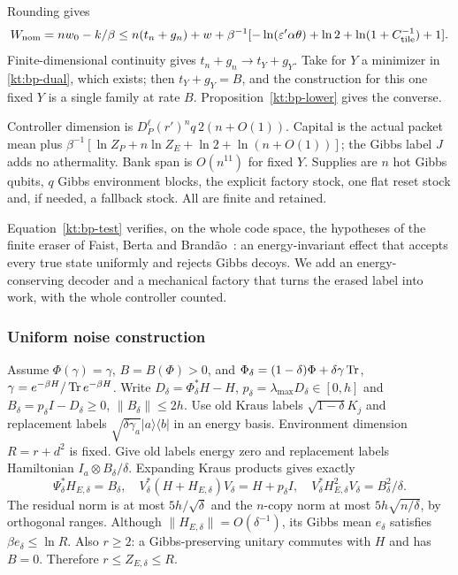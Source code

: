 Rounding gives
\[
 W_{\rm nom}=nw_0-k/\beta
 \le n(t_n+g_n)+w+\beta^{-1}
 [-\ln(\varepsilon'\alpha\theta)+\ln2+
              \ln(1+C_{\rm tile}^{-1})+1].
\]
Finite-dimensional continuity gives $t_n+g_n\to t_Y+g_Y$.
Take for $Y$ a minimizer in \eqref{kt:bp-dual}, which exists; then
$t_Y+g_Y=B$, and the construction for this one fixed $Y$ is a single
family at rate $B$.
Proposition~\ref{kt:bp-lower} gives the converse.

Controller dimension is $D_P^\ell(r')^nq\,2(n+O(1))$.
Capital is the actual packet mean plus
$\beta^{-1}[\ln Z_P+n\ln Z_E+\ln2+\ln(n+O(1))]$;
the Gibbs label $J$ adds no athermality. Bank span is $O(n^{11})$
for fixed $Y$. Supplies are $n$ hot Gibbs qubits, $q$ Gibbs
environment blocks, the explicit factory stock, one flat reset stock
and, if needed, a fallback stock. All are finite and retained.

\begin{remark}\label{kt:bp-rem:eraser}
Equation~\eqref{kt:bp-test} verifies, on the whole code space, the hypotheses of the finite eraser of Faist, Berta and Brand\~ao~\cite[Prop.~7.1]{FBB21}: an energy-invariant effect that accepts every true state uniformly and rejects Gibbs decoys. We add an energy-conserving decoder and a mechanical factory that turns the erased label into work, with the whole controller counted.
\end{remark}

\subsubsection{Uniform noise construction}
Assume $\Phi(\gamma)=\gamma$, $B=B(\Phi)>0$, and
$\Phi_\delta=(1-\delta)\Phi+\delta\gamma\operatorname{Tr}$,
$\gamma=e^{-\beta H}/\operatorname{Tr} e^{-\beta H}$.
Write $D_\delta=\Phi_\delta^*H-H$,
$p_\delta=\lambda_{\max}D_\delta\in[0,h]$ and
$B_\delta=p_\delta I-D_\delta\ge0$, $\|B_\delta\|\le2h$.
Use old Kraus labels $\sqrt{1-\delta}K_j$ and replacement labels
$\sqrt{\delta\gamma_a}|a\rangle\langle b|$ in an energy basis.
Environment dimension $R=r+d^2$ is fixed. Give old labels energy
zero and replacement labels Hamiltonian $I_a\otimes B_\delta/\delta$.
Expanding Kraus products gives exactly
\[
 \Psi_\delta^*H_{E,\delta}=B_\delta,\quad
 V_\delta^*(H+H_{E,\delta})V_\delta=H+p_\delta I,\quad
 V_\delta^*H_{E,\delta}^2V_\delta=B_\delta^2/\delta .
\]
The residual norm is at most $5h/\sqrt\delta$ and the $n$-copy norm
at most $5h\sqrt{n/\delta}$, by orthogonal ranges.
Although $\|H_{E,\delta}\|=O(\delta^{-1})$, its Gibbs mean
$e_\delta$ satisfies $\beta e_\delta\le\ln R$.
Also $r\ge2$: a Gibbs-preserving unitary commutes with $H$ and has
$B=0$. Therefore $r\le Z_{E,\delta}\le R$.

